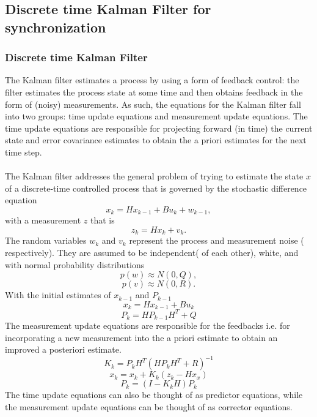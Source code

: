 \documentclass[a4paper,10pt]{report}
\begin{document}
\subsection{\textbf{Discrete time Kalman Filter for synchronization}}
\subsubsection{Discrete time Kalman Filter}
The Kalman filter estimates a process by using a form of feedback control: the filter estimates the process state at some time and
then obtains feedback in the form of (noisy) measurements. As such, the equations for the Kalman filter fall into two groups: time
update equations and measurement update equations. The time update equations are responsible for projecting forward (in time) the
current state and error covariance estimates to obtain the a priori estimates for the next time step.
\paragraph*{}
The Kalman filter addresses the general problem of trying to estimate the state $x$ of a discrete-time controlled process that is
governed by the stochastic difference equation
\begin{equation}
 x_k = Hx_{k-1} + Bu_k + w_{k-1} ,
\end{equation}
with a measurement $z$ that is
\begin{equation}
 z_k = Hx_k + v_k.
\end{equation}
The random variables $w_k$ and $v_k$ represent the process and measurement noise ( respectively). They are assumed to be independent( of each other), white, and with normal probability distributions
\begin{equation}
 p(w) \approx N(0,Q),
\end{equation}
\begin{equation}
 p(v) \approx N(0,R).
\end{equation}
With the initial estimates of $x_{k-1}$ and $P_{k-1}$
\begin{equation}
x_k = Hx_{k-1} + Bu_k
\end{equation}
\begin{equation}
P_k = HP_{k-1}H^T + Q
\end{equation}
The measurement update equations are responsible for the feedbacks i.e. for incorporating a new measurement into the a priori estimate
to obtain an improved a posteriori estimate.
\begin{equation}
K_k = P_kH^T(HP_kH^T + R)^{-1} \label{kalmangain}
\end{equation}
\begin{equation}
x_k = x_k + K_k(z_k - Hx_x)
\end{equation}
\begin{equation}
P_k = (I-K_kH)P_k
\end{equation}
The time update equations can also be thought of as predictor equations, while the measurement update equations can be thought of as corrector equations.
\end{document}
